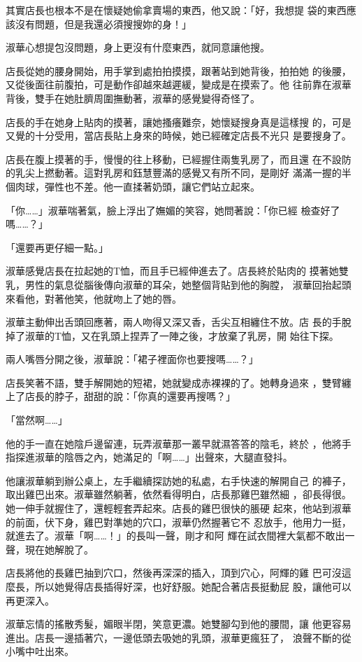 其實店長也根本不是在懷疑她偷拿賣場的東西，他又說：「好，我想提
袋的東西應該沒有問題，但是我還必須搜搜妳的身！」

淑華心想提包沒問題，身上更沒有什麼東西，就同意讓他搜。

店長從她的腰身開始，用手掌到處拍拍摸摸，跟著站到她背後，拍拍她
的後腰，又從後面往前腹拍，可是動作卻越來越遲緩，變成是在摸索了。他
往前靠在淑華背後，雙手在她肚臍周圍撫動著，淑華的感覺變得奇怪了。

店長的手在她身上貼肉的摸著，讓她搔癢難奈，她懷疑搜身真是這樣搜
的，可是又覺的十分受用，當店長貼上身來的時候，她已經確定店長不光只
是要搜身了。

店長在腹上摸著的手，慢慢的往上移動，已經握住兩隻乳房了，而且還
在不設防的乳尖上撚動著。這對乳房和鈺慧豐滿的感覺又有所不同，是剛好
滿滿一握的半個肉球，彈性也不差。他一直揉著奶頭，讓它們站立起來。

「你……」淑華喘著氣，臉上浮出了嫵媚的笑容，她問著說：「你已經
檢查好了嗎……？」

「還要再更仔細一點。」

淑華感覺店長在拉起她的T恤，而且手已經伸進去了。店長終於貼肉的
摸著她雙乳，男性的氣息從腦後傳向淑華的耳朵，她整個背貼到他的胸膛，
淑華回抬起頭來看他，對著他笑，他就吻上了她的唇。

淑華主動伸出舌頭回應著，兩人吻得又深又香，舌尖互相纏住不放。店
長的手脫掉了淑華的T恤，又在乳頭上捏弄了一陣之後，才放棄了乳房，開
始往下探。

兩人嘴唇分開之後，淑華說：「裙子裡面你也要搜嗎……？」

店長笑著不語，雙手解開她的短裙，她就變成赤裸裸的了。她轉身過來
，雙臂纏上了店長的脖子，甜甜的說：「你真的還要再搜嗎？」

「當然啊……」

他的手一直在她陰戶邊留連，玩弄淑華那一叢早就濕答答的陰毛，終於
，他將手指探進淑華的陰唇之內，她滿足的「啊……」出聲來，大腿直發抖。

他讓淑華躺到辦公桌上，左手繼續探訪她的私處，右手快速的解開自己
的褲子，取出雞巴出來。淑華雖然躺著，依然看得明白，店長那雞巴雖然細
，卻長得很。她一伸手就握住了，還輕輕套弄起來。店長的雞巴很快的脹硬
起來，他站到淑華的前面，伏下身，雞巴對準她的穴口，淑華仍然握著它不
忍放手，他用力一挺，就進去了。淑華「啊……！」的長叫一聲，剛才和阿
輝在試衣間裡大氣都不敢出一聲，現在她解脫了。

店長將他的長雞巴抽到穴口，然後再深深的插入，頂到穴心，阿輝的雞
巴可沒這麼長，所以她覺得店長插得好深，也好舒服。她配合著店長挺動屁
股，讓他可以再更深入。

淑華忘情的搖散秀髮，媚眼半閉，笑意更濃。她雙腳勾到他的腰間，讓
他更容易進出。店長一邊插著穴，一邊低頭去吸她的乳頭，淑華更瘋狂了，
浪聲不斷的從小嘴中吐出來。

